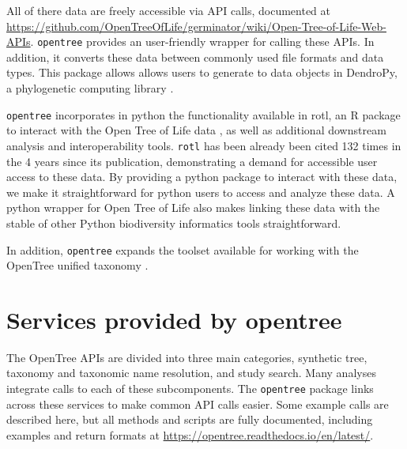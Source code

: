 \documentclass[oupdraft]{sysbio_sse}
\begin{document}
All of there data are freely accessible via API calls, documented at \url{https://github.com/OpenTreeOfLife/germinator/wiki/Open-Tree-of-Life-Web-APIs}.
\texttt{opentree}  provides an user-friendly wrapper for calling these APIs.
In addition, it converts these data between commonly used file formats and data types.
This package allows allows users to generate to data objects in DendroPy, a phylogenetic computing library \citep{sukumaran_dendropy_2010}.


\texttt{opentree} incorporates in python the functionality available in rotl, an {R} package to interact with the Open Tree of Life data \citep{michonneau_rotl_2016}, as well as additional downstream analysis and interoperability tools.
\texttt{rotl} has been already been cited 132 times in the 4 years since its publication, demonstrating a demand for accessible user access to these data.
By providing a python package to interact with these data, we make it straightforward for python users to access and analyze these data.
A python wrapper for Open Tree of Life also makes linking these data with the stable of other Python biodiversity informatics tools straightforward.

In addition, \texttt{opentree} expands the toolset available for working with the OpenTree unified taxonomy \citep{rees_automated_2017}.


\bigskip
\section{Services provided by opentree}
\label{sec3}


The OpenTree APIs are divided into three main categories, synthetic tree,  taxonomy and taxonomic name resolution, and study search.
Many analyses integrate calls to each of these subcomponents. 
The \texttt{opentree} package links across these services to make common API calls easier.
Some example calls are described here, but all methods and scripts are fully documented, including examples and return formats at \url{https://opentree.readthedocs.io/en/latest/}.
\end{document}
